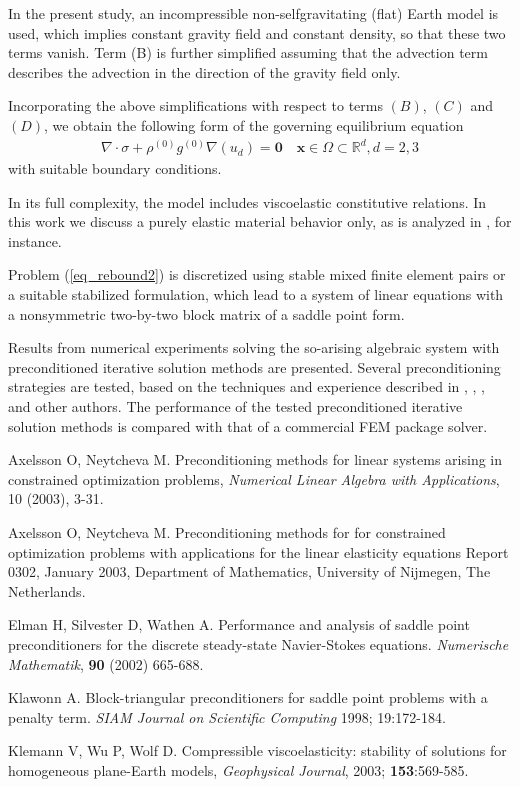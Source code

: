 \documentclass{report}
\begin{document}
In the present study, an incompressible non-selfgravitating (flat) Earth
model is used, which implies constant gravity field and constant density,
so that these two terms vanish. Term (B)
is further simplified assuming that the advection term describes the
advection in the direction of the gravity field only.

Incorporating the above simplifications with respect to terms
$(B)$, $(C)$ and $(D)$, we obtain the following form of the governing
equilibrium equation
\begin{equation}
\begin{array}{l}
\nabla\cdot \sigma +
\rho^{(0)}g^{(0)} \nabla(u_d) = \mathbf{0} \quad
\mathbf{x}\in\Omega\subset\mathbb{R}^d, d=2,3
\end{array}
\label{eq_rebound2}
\end{equation}
with suitable boundary conditions.

In its full complexity, the model includes viscoelastic constitutive
relations. In this work we discuss a purely elastic material behavior
only, as is analyzed in \cite{KlemannWuWolf}, for instance.

Problem (\ref{eq_rebound2}) is discretized using stable mixed finite
element pairs or a suitable stabilized formulation,
which lead to a system of linear equations with a nonsymmetric
two-by-two block matrix of a saddle point form.

Results from numerical experiments solving the so-arising algebraic
system with preconditioned iterative solution methods are presented.
Several preconditioning strategies are tested, based on the techniques
and experience described in \cite{Klawonn}, \cite{elman},
\cite{AxelssonNeytcheva}, \cite{AxelssonNeytcheva1} and other authors.
The performance of the tested preconditioned iterative solution methods
is compared with that of a commercial FEM package solver.

\begin{thebibliography}{ABC}
Axelsson O, Neytcheva M.
Preconditioning methods for linear systems arising in constrained optimization problems,
{\em Numerical Linear Algebra with Applications}, 10 (2003), 3-31.

Axelsson O, Neytcheva M.
Preconditioning methods for for constrained optimization problems with
applications for the linear elasticity equations
Report 0302, January 2003, Department of Mathematics,
University of Nijmegen, The Netherlands.

Elman H, Silvester D, Wathen A. Performance and analysis of saddle point
preconditioners for the discrete steady-state Navier-Stokes equations.
\textit{Numerische Mathematik}, {\bf 90} (2002) 665-688.

 Klawonn A. Block-triangular preconditioners for saddle
point problems with a penalty term. {\em SIAM Journal on Scientific
Computing} 1998;
19:172-184.

Klemann V, Wu P, Wolf D. Compressible viscoelasticity: stability of
solutions for homogeneous plane-Earth models,
\textit{Geophysical Journal}, 2003; \textbf{153}:569-585.


\end{thebibliography}
\end{document}
